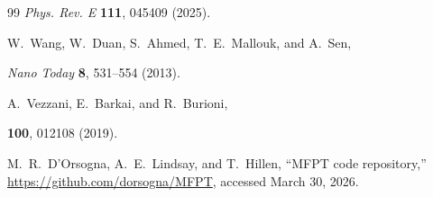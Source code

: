 \documentclass[
 reprint,










 amsmath,amssymb,
 aps, prl,






longbibliography
]{revtex4-2}
\begin{document}
\begin{thebibliography}{99}
\emph{Phys. Rev. E} \textbf{111}, 045409 (2025).

W.~Wang, W.~Duan, S.~Ahmed, T.~E.~Mallouk, and A.~Sen,

 \emph{Nano Today} \textbf{8}, 531--554 (2013).

A.~Vezzani, E.~Barkai, and R.~Burioni,

\textbf{100}, 012108 (2019).

M.~R.~D'Orsogna, A.~E.~Lindsay, and T.~Hillen, ``MFPT code repository,'' \url{https://github.com/dorsogna/MFPT}, accessed March 30, 2026.

\end{thebibliography}
\end{document}
